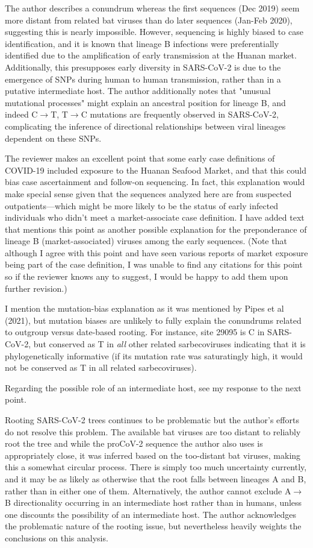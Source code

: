 \documentclass[11pt, oneside]{article}   	%
\newcommand{\response}[1]{{\color{black}#1}}
\begin{document}
The author describes a conundrum whereas the first sequences (Dec 2019) seem more distant from related bat viruses than do later sequences (Jan-Feb 2020), suggesting this is nearly impossible. However, sequencing is highly biased to case identification, and it is known that lineage B infections were preferentially identified due to the amplification of early transmission at the Huanan market. Additionally, this presupposes early diversity in SARS-CoV-2 is due to the emergence of SNPs during human to human transmission, rather than in a putative intermediate host. The author additionally notes that "unusual mutational processes" might explain an ancestral position for lineage B, and indeed C$\rightarrow$T, T$\rightarrow$C mutations are frequently observed in SARS-CoV-2, complicating the inference of directional relationships between viral lineages dependent on these SNPs.

\response{The reviewer makes an excellent point that some early case definitions of COVID-19 included exposure to the Huanan Seafood Market, and that this could bias case ascertainment and follow-on sequencing.
In fact, this explanation would make special sense given that the sequences analyzed here are from suspected outpatients---which might be more likely to be the status of early infected individuals who didn't meet a market-associate case definition.
I have added text that mentions this point as another possible explanation for the preponderance of lineage B (market-associated) viruses among the early sequences.
(Note that although I agree with this point and have seen various reports of market exposure being part of the case definition, I was unable to find any citations for this point so if the reviewer knows any to suggest, I would be happy to add them upon further revision.)

I mention the mutation-bias explanation as it was mentioned by Pipes et al (2021), but mutation biases are unlikely to fully explain the conundrums related to outgroup versus date-based rooting.
For instance, site 29095 is C in SARS-CoV-2, but conserved as T in \emph{all} other related sarbecoviruses indicating that it is phylogenetically informative (if its mutation rate was saturatingly high, it would not be conserved as T in all related sarbecoviruses).

Regarding the possible role of an intermediate host, see my response to the next point.
}

Rooting SARS-CoV-2 trees continues to be problematic but the author's efforts do not resolve this problem. The available bat viruses are too distant to reliably root the tree and while the proCoV-2 sequence the author also uses is appropriately close, it was inferred based on the too-distant bat viruses, making this a somewhat circular process. There is simply too much uncertainty currently, and it may be as likely as otherwise that the root falls between lineages A and B, rather than in either one of them. Alternatively, the author cannot exclude A$\rightarrow$B directionality occurring in an intermediate host rather than in humans, unless one discounts the possibility of an intermediate host. The author acknowledges the problematic nature of the rooting issue, but nevertheless heavily weights the conclusions on this analysis.
\end{document}
